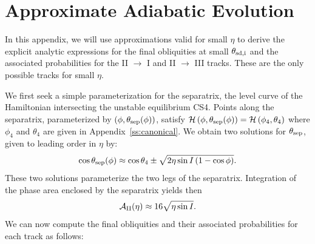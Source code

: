 \documentclass[twocolumn,twocolappendix]{aastex63}
\newcommand*{\p}[1]{\left(#1\right)}
\begin{document}
\section{Approximate Adiabatic Evolution}\label{s:ad_approx}

In this appendix, we will use approximations valid for small $\eta$ to derive
the explicit analytic expressions for the final obliquities at small
$\theta_{\rm sd, i}$ and the associated probabilities for the II $\to$ I and II
$\to$ III tracks. These are the only possible tracks for small $\eta$.

We first seek a simple parameterization for the separatrix, the level curve of
the Hamiltonian intersecting the unstable equilibrium CS4. Points along the
separatrix, parameterized by $\p{\phi, \theta_{\rm sep}(\phi)}$, satisfy
$\mathcal{H}\p{\phi, \theta_{\rm sep}(\phi)} = \mathcal{H}\p{\phi_4, \theta_4}$
where $\phi_4$ and $\theta_4$ are given in Appendix~\ref{ss:canonical}. We
obtain two solutions for $\theta_{\rm sep}$, given to leading order in $\eta$
by:
\begin{equation}
    \cos \theta_{\rm sep}(\phi) \approx \cos \theta_4 \pm
        \sqrt{2\eta \sin I\p{1 - \cos \phi}}.
\end{equation}
These two solutions parameterize the two legs of the separatrix. Integration of
the phase area enclosed by the separatrix yields then
\begin{equation}
    \mathcal{A}_{\rm II}(\eta) \approx 16\sqrt{\eta \sin I}.\label{eq:a_approx}
\end{equation}
We can now compute the final obliquities and their associated probabilities for
each track as follows:
\end{document}
